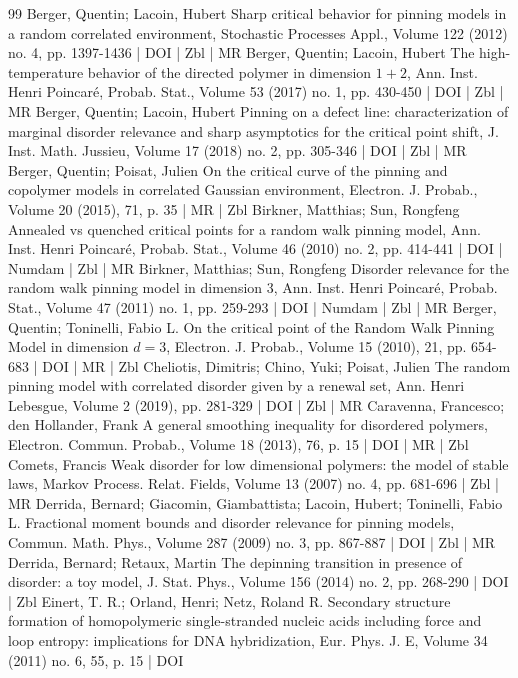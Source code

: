 \begin{thebibliography}{99}
Berger, Quentin; Lacoin, Hubert Sharp critical behavior for pinning models in a random correlated environment, Stochastic Processes Appl., Volume 122 (2012) no. 4, pp. 1397-1436 | DOI | Zbl | MR
Berger, Quentin; Lacoin, Hubert The high-temperature behavior of the directed polymer in dimension $1+2$, Ann. Inst. Henri Poincaré, Probab. Stat., Volume 53 (2017) no. 1, pp. 430-450 | DOI | Zbl | MR
Berger, Quentin; Lacoin, Hubert Pinning on a defect line: characterization of marginal disorder relevance and sharp asymptotics for the critical point shift, J. Inst. Math. Jussieu, Volume 17 (2018) no. 2, pp. 305-346 | DOI | Zbl | MR
Berger, Quentin; Poisat, Julien On the critical curve of the pinning and copolymer models in correlated Gaussian environment, Electron. J. Probab., Volume 20 (2015), 71, p. 35 | MR | Zbl
Birkner, Matthias; Sun, Rongfeng Annealed vs quenched critical points for a random walk pinning model, Ann. Inst. Henri Poincaré, Probab. Stat., Volume 46 (2010) no. 2, pp. 414-441 | DOI | Numdam | Zbl | MR
Birkner, Matthias; Sun, Rongfeng Disorder relevance for the random walk pinning model in dimension 3, Ann. Inst. Henri Poincaré, Probab. Stat., Volume 47 (2011) no. 1, pp. 259-293 | DOI | Numdam | Zbl | MR
Berger, Quentin; Toninelli, Fabio L. On the critical point of the Random Walk Pinning Model in dimension $d=3$, Electron. J. Probab., Volume 15 (2010), 21, pp. 654-683 | DOI | MR | Zbl
Cheliotis, Dimitris; Chino, Yuki; Poisat, Julien The random pinning model with correlated disorder given by a renewal set, Ann. Henri Lebesgue, Volume 2 (2019), pp. 281-329 | DOI | Zbl | MR
Caravenna, Francesco; den Hollander, Frank A general smoothing inequality for disordered polymers, Electron. Commun. Probab., Volume 18 (2013), 76, p. 15 | DOI | MR | Zbl
Comets, Francis Weak disorder for low dimensional polymers: the model of stable laws, Markov Process. Relat. Fields, Volume 13 (2007) no. 4, pp. 681-696 | Zbl | MR
Derrida, Bernard; Giacomin, Giambattista; Lacoin, Hubert; Toninelli, Fabio L. Fractional moment bounds and disorder relevance for pinning models, Commun. Math. Phys., Volume 287 (2009) no. 3, pp. 867-887 | DOI | Zbl | MR
Derrida, Bernard; Retaux, Martin The depinning transition in presence of disorder: a toy model, J. Stat. Phys., Volume 156 (2014) no. 2, pp. 268-290 | DOI | Zbl
Einert, T. R.; Orland, Henri; Netz, Roland R. Secondary structure formation of homopolymeric single-stranded nucleic acids including force and loop entropy: implications for DNA hybridization, Eur. Phys. J. E, Volume 34 (2011) no. 6, 55, p. 15 | DOI

\end{thebibliography}
